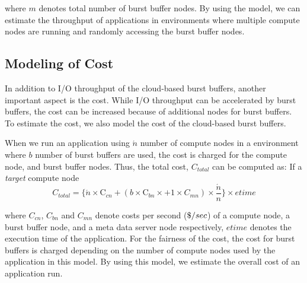 where $m$ denotes total number of burst buffer nodes. 
By using the model, we can estimate the throughput of applications in
environments where multiple compute nodes are running and randomly accessing the
burst buffer nodes.

\subsection{Modeling of Cost}
In addition to I/O throughput of the cloud-based burst buffers, another
important aspect is the cost.
While I/O throughput can be accelerated by burst buffers, the cost can be
increased because of additional nodes for burst buffers.
To estimate the cost, we also model the cost of the cloud-based burst buffers.

When we run an application using $\acute{n}$ number of compute nodes in a
environment where $b$ number of burst buffers are used, the cost is charged for
the compute node, and burst buffer nodes.
Thus, the total cost, $C_{total}$ can be computed as:   If a \emph{target}
compute node
\begin{equation}
C_{total} = \{　\acute{n} \times \text{C}_{cn}+ (b \times \text{C}_{bn} \times
 + 1 \times C_{mn}) \times \frac{\acute{n}}{n} \}\times etime
\end{equation}

where $C_{cn}$, $C_{bn}$ and $C_{mn}$ denote costs per second (${\it \$} /sec$)
of a compute node, a burst buffer node, and a meta data server node
respectively, $etime$ denotes the execution time of the application. For the
fairness of the cost, the cost for burst buffers is charged depending on the
number of compute nodes used by the application in this model. By using this
model, we estimate the overall cost of an application run. 


